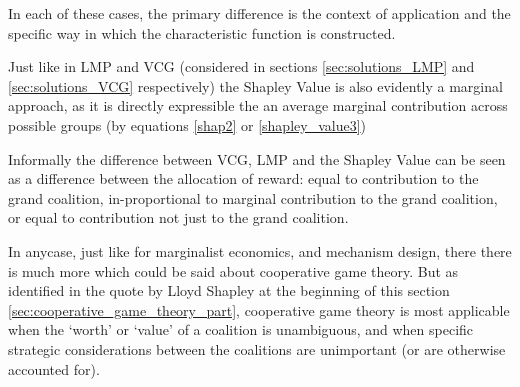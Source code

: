In each of these cases, the primary difference is the context of application and the specific way in which the characteristic function is constructed.


Just like in LMP and VCG (considered in sections \ref{sec:solutions_LMP} and \ref{sec:solutions_VCG} respectively) the Shapley Value is also evidently a marginal approach, as it is directly expressible the an average marginal contribution across possible groups (by equations \ref{shap2} or \ref{shapley_value3})

Informally the difference between VCG, LMP and the Shapley Value can be seen as a difference between the allocation of reward: equal to contribution to the grand coalition, in-proportional to marginal contribution to the grand coalition, or equal to contribution not just to the grand coalition.

In anycase, just like for marginalist economics, and mechanism design, there there is much more which could be said about cooperative game theory.
But as identified in the quote by Lloyd Shapley at the beginning of this section \ref{sec:cooperative_game_theory_part}, cooperative game theory is most applicable when the `worth' or `value' of a coalition is unambiguous, and when specific strategic considerations between the coalitions are unimportant (or are otherwise accounted for).

